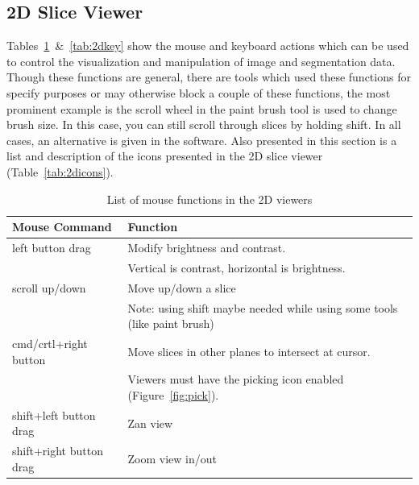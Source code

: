 \documentclass[fleqn,11pt,openany]{book}
\begin{document}
\subsection{2D Slice Viewer}

Tables~\ref{tab:2dmouse}~\&~\ref{tab:2dkey}  show the mouse and keyboard actions which can be used to control the visualization and manipulation of image and segmentation data.  Though these functions are general, there are tools which used these functions for specify purposes or may otherwise block a couple of these functions, the most prominent example is the scroll wheel in the paint brush tool is used to change brush size.  In this case, you can still scroll through slices by holding shift.  In all cases, an alternative is given in the software.  Also presented in this section is a list and description of the icons presented in the 2D slice viewer (Table~\ref{tab:2dicons}).

\begin{table}[h!]
\label{tab:2dmouse}
\caption{List of mouse functions in the 2D viewers}
\begin{tabular}{|l|l|}
\hline
{\bf Mouse Command} & {\bf Function}\\
\hline
left button drag & Modify brightness and contrast.  \\ &Vertical is contrast, horizontal is brightness. \\
\hline 
scroll up/down & Move up/down a slice\\ &Note: using shift maybe needed while using some tools (like paint brush)\\
\hline
cmd/crtl+right button & Move slices in other planes to intersect at cursor.\\  &Viewers must have the picking icon enabled (Figure~\ref{fig:pick}).\\
\hline
shift+left button drag & Zan view\\
shift+right button drag & Zoom view in/out\\
\hline
\end{tabular}
\end{table}
\end{document}
